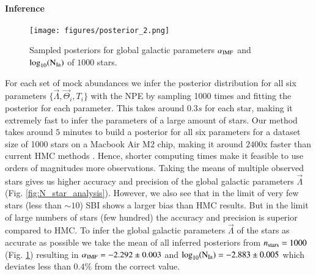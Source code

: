 \documentclass{aa}
\begin{document}
\paragraph{Inference}
\begin{figure}
\vspace{-1.3cm}
    \centering
    \texttt{[image: figures/posterior\_2.png]}
    \vspace{-.25cm}
    \caption{Sampled posteriors for global galactic parameters $\alpha_{\rm IMF}$ and $\log_{10}(\rm N_{Ia})$ of $1000$ stars.}
    \label{fig:sbi}   
\end{figure}
\enlargethispage{0\baselineskip}
For each set of mock abundances we infer the posterior distribution for all six parameters $\{\vec\Lambda,\vec\Theta_i,T_i\}$ with the NPE by sampling 1000 times and fitting the posterior for each parameter. This takes around $0.3s$ for each star, making it extremely fast to infer the parameters of a large amount of stars. 
Our method takes around $5$ minutes to build a posterior for all six parameters for a dataset size of 1000 stars on a Macbook Air M2 chip, making it around $2400$x faster than current HMC methods \citep[cf.][who needs $40$h for 200 stars with HMC]{Philcox_2019}. Hence, shorter computing times make it feasible to use orders of magnitudes more observations.
%
Taking the means of multiple observed stars gives us higher accuracy and precision of the global galactic parameters $\vec\Lambda$ (Fig. \ref{fig:N_star_analysis}). However, we also see that in the limit of very few stars (less than $\sim10$) SBI shows a larger bias than HMC results. But in the limit of large numbers of stars (few hundred) the accuracy and precision is superior compared to HMC.
%
To infer the global galactic parameters $\vec\Lambda$ of the stars as accurate as possible we take the mean of all inferred posteriors from $n_{\rm stars}=1000$ (Fig. \ref{fig:sbi}) resulting in $\alpha_{\rm IMF}=-2.292\pm0.003$ and $\log_{10}(\rm N_{Ia})=-2.883\pm0.005$ which deviates less than $0.4\%$ from the correct value.

\end{document}
